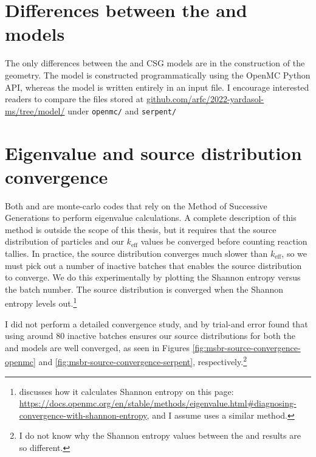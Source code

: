 \section{Differences between the \OpenMC and \SerpentTWO models}
The only differences between the \OpenMC and \SerpentTWO CSG models are in the
construction of the geometry. The \OpenMC model is constructed programmatically
using the OpenMC Python API, whereas the \SerpentTWO model is written entirely
in an input file. I encourage interested readers to compare the files stored at
\url{github.com/arfc/2022-yardasol-ms/tree/model/} under \verb.openmc/. and
\verb.serpent/.

\section{Eigenvalue and source distribution convergence}
Both \SerpentTWO and \OpenMC are monte-carlo codes that rely on the Method of
Successive Generations to perform eigenvalue calculations. A complete
description of this method is outside the scope of this thesis, but it requires
that the source distribution of particles and our $k_{\text{eff}}$ values
be converged before counting reaction tallies. In practice, the source
distribution converges much slower than $k_{\text{eff}}$, so we must pick out
a number of inactive batches that enables the source distribution to
converge. We do this experimentally by plotting the Shannon entropy
versus the batch number. The source distribution is converged when the 
Shannon entropy levels out.\footnote{\OpenMC discusses how it calculates Shannon entropy
on this page: \url{https://docs.openmc.org/en/stable/methods/eigenvalue.html\#diagnosing-convergence-with-shannon-entropy},
and I assume \SerpentTWO uses a similar method.}

I did not perform a detailed convergence study, and by trial-and error found
that using around 80 inactive batches ensures our source distributions for both
the \OpenMC and \SerpentTWO models are well converged, as seen in Figures
\ref{fig:msbr-source-convergence-openmc} and \ref{fig:msbr-source-convergence-serpent},
respectively.\footnote{I do not know why the Shannon entropy values between the
\SerpentTWO and \OpenMC results are so different.}

